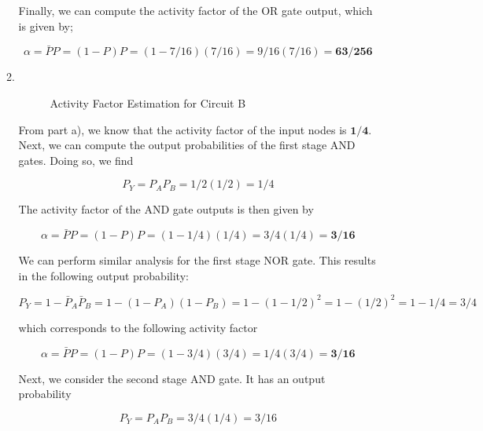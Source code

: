 \documentclass[fleqn]{article}
\begin{document}
\begin{enumerate}
\begin{enumerate}
			Finally, we can compute the activity factor of the OR gate output, which is given by;
			
			\begin{equation*}
				\alpha = \bar{P}P = (1 - P)P = (1 - 7/16)(7/16) = 9/16(7/16) = \mathbf{63/256}
			\end{equation*}
			
			\pagebreak
			\item ~
			
			\begin{figure}[H]				
				\centerline{}
				\caption{Activity Factor Estimation for Circuit B}
				\label{fig::activity_factor_b}
			\end{figure}
			
			From part a), we know that the activity factor of the input nodes is $\mathbf{1/4}$. Next, we can compute the output probabilities of the first stage AND gates. Doing so, we find
			
			\begin{equation*}
				P_Y = P_AP_B = 1/2(1/2) = 1/4
			\end{equation*}
			
			The activity factor of the AND gate outputs is then given by
			
			\begin{equation*}
				\alpha = \bar{P}P = (1 - P)P = (1 - 1/4)(1/4) = 3/4(1/4) = \mathbf{3/16}
			\end{equation*}
			
			We can perform similar analysis for the first stage NOR gate. This results in the following output probability:
			
			\begin{equation*}
				P_Y = 1 - \bar{P}_A\bar{P}_B = 1 - (1 - P_A)(1 - P_B) = 1 - (1 - 1/2)^2 = 1 - (1/2)^2 = 1 - 1/4 = 3/4
			\end{equation*}
			
			which corresponds to the following activity factor
			
			\begin{equation*}
				\alpha = \bar{P}P = (1 - P)P = (1 - 3/4)(3/4) = 1/4(3/4) = \mathbf{3/16}
			\end{equation*}
			
			Next, we consider the second stage AND gate. It has an output probability
			
			\begin{equation*}
				P_Y = P_AP_B = 3/4(1/4) = 3/16
			\end{equation*}
			

\end{enumerate}
\end{enumerate}
\end{document}
